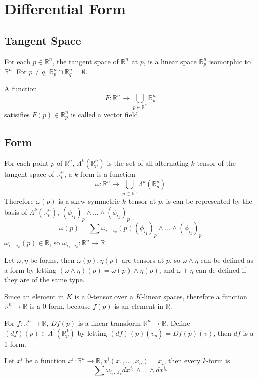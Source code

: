 
\section{Differential Form}
\subsection{Tangent Space}
For each $p \in \mathbb R^n$, the tangent space of $\mathbb R^n$ at $p$,
is a linear space $\mathbb R^n_p$ isomorphic to $\mathbb R^n$.
For $p \neq q$, $\mathbb R^n_p \cap \mathbb R^n_q = \emptyset$.

A function $$F : \mathbb R^n \to \bigcup_{p \in \mathbb R^n} \mathbb R^n_p$$ satisifies
$F(p) \in \mathbb R^n_p$ is called a vector field.

\subsection{Form}
For each point $p$ of $\mathbb R^n$, $\Lambda^k(\mathbb R^n_p)$ is the set of all alternating
$k$-tensor of the tangent space of $\mathbb R^n_p$, a $k$-form is a function
$$\omega : \mathbb R^n \to \bigcup_{p \in \mathbb R^n} \Lambda^k(\mathbb R^n_p)$$
Therefore $\omega(p)$ is a skew symmetric $k$-tensor at $p$,
is can be represented by the basis of $\Lambda^k(\mathbb R^n_p)$,
$(\phi_{i_1})_p \wedge \dots \wedge (\phi_{i_k})_p$
$$\omega(p) = \sum \omega_{i_1\dots i_k}(p) (\phi_{i_1})_p \wedge \dots \wedge (\phi_{i_k})_p$$
$\omega_{i_1\dots i_k}(p) \in \mathbb{R}$, so $\omega_{i_1\dots i_k} : \mathbb{R}^n \to \mathbb{R}$.

Let $\omega, \eta$ be forms, then $\omega(p), \eta(p)$ are tensors at $p$,
so $\omega \wedge \eta$ can be defined as a form by letting
$(\omega \wedge \eta)(p) = \omega(p) \wedge \eta(p)$,
and $\omega + \eta$ can de defined if they are of the same type.


Since an element in $K$ is a $0$-tensor over a $K$-linear spaces,
therefore a function $\mathbb{R}^n \to \mathbb{R}$ is a $0$-form,
because $f(p)$ is an element in $\mathbb{R}$.

For $f : \mathbb{R}^n \to \mathbb{R}$, $Df(p)$ is a linear transform $\mathbb{R}^n \to \mathbb{R}$.
Define $(df)(p) \in \Lambda^1(\mathbb{R}^1_p)$ by letting $(df)(p)(v_p) = Df(p)(v)$,
then $df$ is a $1$-form.

Let $x^i$ be a function $x^i : \mathbb R^n \to \mathbb R, x^i(x_1, \dots, x_n) = x_i$,
then every $k$-form is
$$\sum \omega_{i_1\dots i_k} dx^{i_1} \wedge \dots \wedge dx^{i_k}$$


